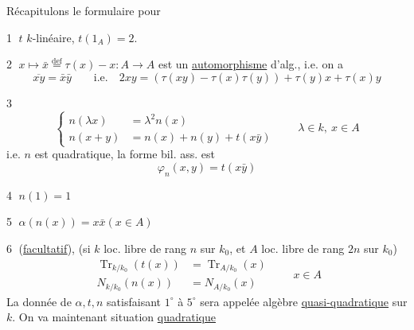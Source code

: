 Récapitulons le formulaire pour

\textcircled{1} $t$  $k$-linéaire, $\boxed{t(1_A)=2}$.

\textcircled{2} $x\longmapsto\bar x\overset{\mathrm{def}}{=}\tau(x)-x:A\longrightarrow A$
est un \uline{automorphisme} d'alg., i.e. on a
\[
 \boxed{\overline{xy}=\bar x\bar y}\qquad\text{i.e.}\quad
 2xy=(\tau(xy)-\tau(x)\tau(y))+\tau(y)x+\tau(x)y
\]

\textcircled{3}
\[
 \boxed{\left\{\begin{aligned}n(\lambda x)&=\lambda^2n(x)\\n(x+y)&=n(x)+n(y)+t(x\bar y)\end{aligned}\right.}
 \qquad\lambda\in k,\ x\in A
\]
i.e. $n$ est quadratique, la forme bil. ass. est 
\[
 \varphi_n(x,y)=t(x\bar y)
\]

\textcircled{4} $\boxed{n(1)=1}$

\textcircled{5} $\boxed{\alpha(n(x))=x\bar x}$\qquad$(x\in A)$

\textcircled{6} (\uline{facultatif}),  (si $k$ loc. libre de rang $n$ sur $k_0$, et $A$ loc. libre de rang $2n$ sur $k_0$)
\[
 \boxed{\begin{aligned}
 \operatorname{Tr}_{k/k_0}(t(x))&=\operatorname{Tr}_{A/k_0}(x)\\
 N_{k/k_0}(n(x))&=N_{A/k_0}(x)
 \end{aligned}}\qquad x\in A
\]
La donnée de  $\alpha,t,n$ satisfaisant $1^\circ$ à $5^\circ$ sera appelée algèbre \uline{quasi-quadratique} sur $k$.
On va maintenant  situation  \uline{quadratique}
